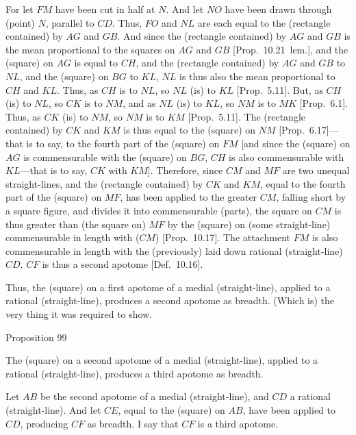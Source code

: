 For let $FM$ have been cut in half at $N$. And let $NO$ have been drawn
through (point) $N$, parallel to $CD$. Thus, $FO$ and
$NL$ are each equal to the (rectangle contained) by $AG$ and $GB$.
And since
the (rectangle contained) by $AG$ and $GB$ is the mean
proportional to the squares on $AG$ and $GB$ [Prop.~10.21~lem.], and the (square) on $AG$
is equal to $CH$, and the (rectangle contained) by $AG$ and
$GB$ to $NL$, and the (square) on $BG$ to $KL$,  $NL$ is thus also the
mean proportional to $CH$ and $KL$. Thus, as $CH$ is to $NL$, so
$NL$ (is) to $KL$ [Prop.~5.11]. But, as $CH$ (is) to $NL$, so $CK$ is to
$NM$, and as $NL$ (is) to $KL$, so $NM$ is to $MK$
[Prop.~6.1]. Thus, as $CK$ (is) to $NM$, so $NM$
is to $KM$ [Prop.~5.11]. The (rectangle contained) by  $CK$ and $KM$ is thus
equal to the (square) on $NM$ [Prop.~6.17]---that is to say, to the fourth part of the
(square) on $FM$ [and since the (square) on $AG$ is commensurable
with the (square) on $BG$, $CH$ is also commensurable with $KL$---that is to say, $CK$ with $KM$].  Therefore, since $CM$ and $MF$ are two
unequal straight-lines, and the (rectangle contained) by $CK$ and
$KM$, equal to the fourth part
of the (square) on $MF$,  has been applied to the greater $CM$,
falling short by a square figure, and divides it into commensurable
(parts), the square on $CM$ is thus greater than (the square on)
$MF$ by the (square) on (some straight-line) commensurable
in length with ($CM$) [Prop.~10.17]. The
attachment $FM$ is also commensurable in length with the (previously)
laid down rational (straight-line) $CD$. $CF$ is thus a second apotome [Def.~10.16].

Thus, the (square) on a first apotome of
a medial (straight-line), applied to a rational (straight-line), produces
 a second apotome as breadth. (Which is) the very thing it was required to
show.


\begin{center}
{\large Proposition 99}
\end{center}

The (square) on a second apotome of a medial
(straight-line), applied to a rational (straight-line), produces a
third apotome  as breadth.

\epsfysize=1.6in
\centerline{}

Let $AB$ be the second apotome of a medial (straight-line), and
$CD$ a rational (straight-line). And let $CE$, equal to the (square) on  $AB$,
have been applied to $CD$, producing $CF$ as breadth. I say that $CF$
is a third apotome.

